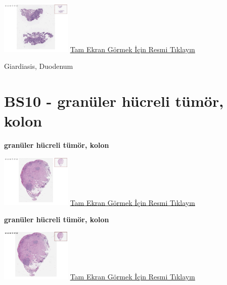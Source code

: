 \documentclass[
  letterpaper,
  DIV=11,
  numbers=noendperiod]{scrreprt}
\begin{document}
\href{https://images.patolojiatlasi.com/BS9/HE2.html}{\includegraphics[width=0.25\textwidth,height=\textheight]{./screenshots/thumbnail_BS9-HE2.png}}
\href{https://images.patolojiatlasi.com/BS9/HE2.html}{Tam Ekran Görmek
İçin Resmi Tıklayın}

\begin{tcolorbox}[enhanced jigsaw, breakable, opacitybacktitle=0.6, arc=.35mm, colbacktitle=quarto-callout-tip-color!10!white, colback=white, toptitle=1mm, left=2mm, opacityback=0, colframe=quarto-callout-tip-color-frame, titlerule=0mm, rightrule=.15mm, bottomrule=.15mm, toprule=.15mm, bottomtitle=1mm, title=\textcolor{quarto-callout-tip-color}{\faLightbulb}\hspace{0.5em}{Tanı}, coltitle=black, leftrule=.75mm]

Giardiasis, Duodenum

\end{tcolorbox}

\hypertarget{sec-BS10}{%
\section{BS10 - granüler hücreli tümör, kolon}\label{sec-BS10}}

\textbf{granüler hücreli tümör, kolon}

\href{https://images.patolojiatlasi.com/BS10/HE1.html}{\includegraphics[width=0.25\textwidth,height=\textheight]{./screenshots/thumbnail_BS10-HE1.png}}
\href{https://images.patolojiatlasi.com/BS10/HE1.html}{Tam Ekran Görmek
İçin Resmi Tıklayın}

\textbf{granüler hücreli tümör, kolon}

\href{https://images.patolojiatlasi.com/BS10/HE2.html}{\includegraphics[width=0.25\textwidth,height=\textheight]{./screenshots/thumbnail_BS10-HE2.png}}
\href{https://images.patolojiatlasi.com/BS10/HE2.html}{Tam Ekran Görmek
İçin Resmi Tıklayın}
\end{document}
